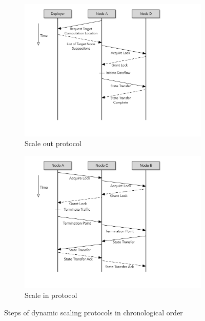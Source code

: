 %
\begin{figure}
        \begin{subfigure}{0.45\textwidth}
                \centering
                \includegraphics[scale=0.45, valign=t]{figures/scale-out.pdf}
                \caption{Scale out protocol}
                \label{fig:scale-out-protocol}    
        \end{subfigure}
        \begin{subfigure}{0.45\textwidth}
                \centering
                \includegraphics[scale=0.45, valign=t]{figures/scale-in.pdf} 
                \caption{Scale in protocol}
                \label{fig:scale-in-protocol}
        \end{subfigure}
        \caption{Steps of dynamic scaling protocols in chronological order}
        \label{fig:dynamic-scaling-protocols}
\end{figure}
%
